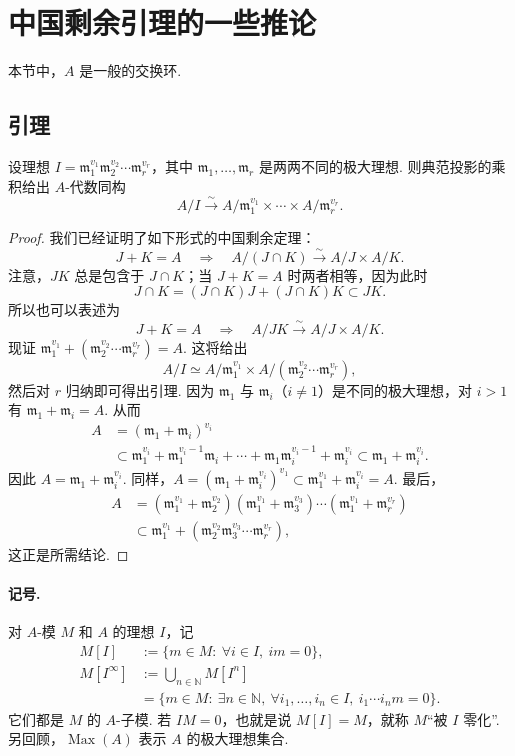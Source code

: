 \section{中国剩余引理的一些推论}\label{sec:galois-1-9}
本节中，$A$ 是一般的交换环.
\subsection{引理}\label{sec:galois-1-9-1}
\begin{lemma*}
设理想 $I=\mathfrak m_1^{v_1}\mathfrak m_2^{v_2}\cdots\mathfrak m_r^{v_r}$，其中 $\mathfrak m_1,\ldots,\mathfrak m_r$ 是两两不同的极大理想. 则典范投影的乘积给出 $A$-代数同构
\[A/I\xrightarrow{\sim}A/\mathfrak m_1^{v_1}\times\cdots\times A/\mathfrak m_r^{v_r}.\]
\end{lemma*}
\begin{proof}
我们已经证明了如下形式的中国剩余定理：
\[J+K=A\quad\Longrightarrow\quad A/(J\cap K)\xrightarrow{\sim}A/J\times A/K.\]
注意，$JK$ 总是包含于 $J\cap K$；当 $J+K=A$ 时两者相等，因为此时
\[J\cap K=(J\cap K)J+(J\cap K)K\subset JK.\]
所以也可以表述为
\[J+K=A\quad\Longrightarrow\quad A/JK\xrightarrow{\sim}A/J\times A/K.\]
现证 $\mathfrak m_1^{v_1}+(\mathfrak m_2^{v_2}\cdots\mathfrak m_r^{v_r})=A$. 这将给出
\[A/I\simeq A/\mathfrak m_1^{v_1}\times A/(\mathfrak m_2^{v_2}\cdots\mathfrak m_r^{v_r}),\]
然后对 $r$ 归纳即可得出引理. 因为 $\mathfrak m_1$ 与 $\mathfrak m_i$（$i\ne1$）是不同的极大理想，对 $i>1$ 有 $\mathfrak m_1+\mathfrak m_i=A$. 从而
\begin{align*}
A&=(\mathfrak m_1+\mathfrak m_i)^{v_i}\\
&\subset\mathfrak m_1^{v_i}+\mathfrak m_1^{v_i-1}\mathfrak m_i+\cdots+\mathfrak m_1\mathfrak m_i^{v_i-1}+\mathfrak m_i^{v_i}
\subset\mathfrak m_1+\mathfrak m_i^{v_i}.
\end{align*}
因此 $A=\mathfrak m_1+\mathfrak m_i^{v_i}$. 同样，$A=(\mathfrak m_1+\mathfrak m_i^{v_i})^{v_1}\subset\mathfrak m_1^{v_1}+\mathfrak m_i^{v_i}=A$. 最后，
\begin{align*}
A&=(\mathfrak m_1^{v_1}+\mathfrak m_2^{v_2})(\mathfrak m_1^{v_1}+\mathfrak m_3^{v_3})\cdots(\mathfrak m_1^{v_1}+\mathfrak m_r^{v_r})\\
&\subset\mathfrak m_1^{v_1}+(\mathfrak m_2^{v_2}\mathfrak m_3^{v_3}\cdots\mathfrak m_r^{v_r}),
\end{align*}
这正是所需结论.
\end{proof}
\paragraph{记号.} 对 $A$-模 $M$ 和 $A$ 的理想 $I$，记
\begin{align*}
M[I]&:=\{m\in M:\ \forall i\in I,\ im=0\},\\
M[I^\infty]&:=\bigcup_{n\in\mathbb N}M[I^n]\\
&=\{m\in M:\ \exists n\in\mathbb N,\ \forall i_1,\ldots,i_n\in I,\ i_1\cdots i_nm=0\}.
\end{align*}
它们都是 $M$ 的 $A$-子模. 若 $IM=0$，也就是说 $M[I]=M$，就称 $M$``被 $I$ 零化''. 另回顾，$\operatorname{Max}(A)$ 表示 $A$ 的极大理想集合.
